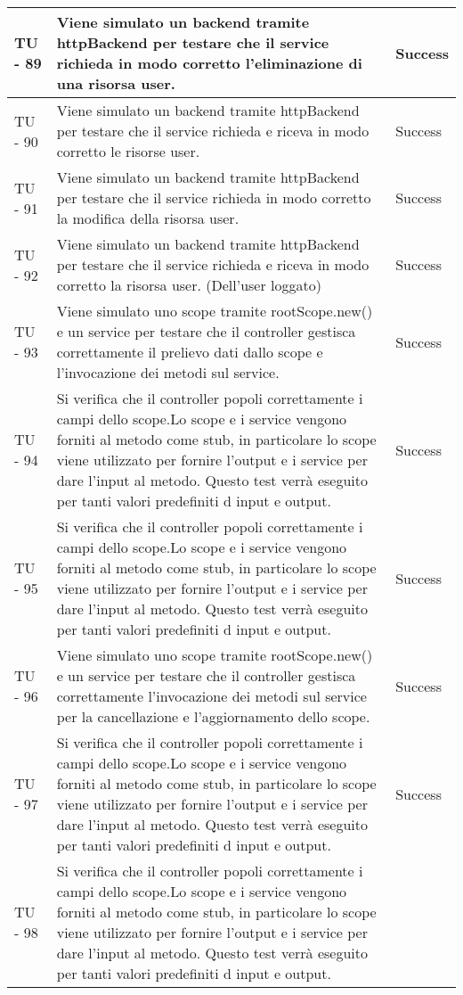 \begin{center}
\begin{longtable}{ | p{3cm} | p{9cm} | p{2cm} | }
TU - 89 & Viene simulato un backend tramite httpBackend per testare che il service richieda in modo corretto l'eliminazione di una risorsa user. & Success \\ \hline
TU - 90 & Viene simulato un backend tramite httpBackend per testare che il service richieda e riceva in modo corretto le risorse user. & Success \\ \hline
TU - 91 & Viene simulato un backend tramite httpBackend per testare che il service richieda in modo corretto la modifica della risorsa user. & Success \\ \hline
TU - 92 & Viene simulato un backend tramite httpBackend per testare che il service richieda e riceva in modo corretto la risorsa user. (Dell'user loggato) & Success \\ \hline
TU - 93 & Viene simulato uno scope tramite rootScope.new() e un service per testare che il controller gestisca correttamente il prelievo dati dallo scope e l'invocazione dei metodi sul service. & Success \\ \hline
TU - 94 & Si verifica che il controller popoli correttamente i campi dello scope.Lo scope e i service vengono forniti al metodo come stub, in particolare lo scope viene utilizzato per fornire l'output e i service per dare l'input al metodo. Questo test verrà eseguito per tanti valori predefiniti d input e output. & Success \\ \hline
TU - 95 & Si verifica che il controller popoli correttamente i campi dello scope.Lo scope e i service vengono forniti al metodo come stub, in particolare lo scope viene utilizzato per fornire l'output e i service per dare l'input al metodo. Questo test verrà eseguito per tanti valori predefiniti d input e output. & Success \\ \hline
TU - 96 & Viene simulato uno scope tramite rootScope.new() e un service per testare che il controller gestisca correttamente l'invocazione dei metodi sul service per la cancellazione e l'aggiornamento dello scope. & Success \\ \hline
TU - 97 & Si verifica che il controller popoli correttamente i campi dello scope.Lo scope e i service vengono forniti al metodo come stub, in particolare lo scope viene utilizzato per fornire l'output e i service per dare l'input al metodo. Questo test verrà eseguito per tanti valori predefiniti d input e output. & Success \\ \hline
TU - 98 & Si verifica che il controller popoli correttamente i campi dello scope.Lo scope e i service vengono forniti al metodo come stub, in particolare lo scope viene utilizzato per fornire l'output e i service per dare l'input al metodo. Questo test verrà eseguito per tanti valori predefiniti d input e output.

\end{longtable}
\end{center}
